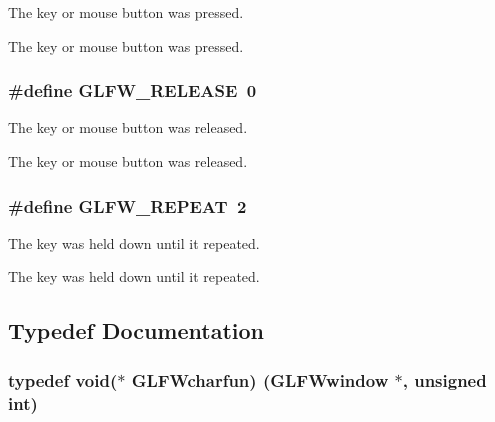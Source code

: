 The key or mouse button was pressed. 

The key or mouse button was pressed. \hypertarget{group__input_gada11d965c4da13090ad336e030e4d11f}{}
\subsubsection[{G\+L\+F\+W\+\_\+\+R\+E\+L\+E\+A\+S\+E}]{\setlength{\rightskip}{0pt plus 5cm}\#define G\+L\+F\+W\+\_\+\+R\+E\+L\+E\+A\+S\+E~0}\label{group__input_gada11d965c4da13090ad336e030e4d11f}


The key or mouse button was released. 

The key or mouse button was released. \hypertarget{group__input_gac96fd3b9fc66c6f0eebaf6532595338f}{}
\subsubsection[{G\+L\+F\+W\+\_\+\+R\+E\+P\+E\+A\+T}]{\setlength{\rightskip}{0pt plus 5cm}\#define G\+L\+F\+W\+\_\+\+R\+E\+P\+E\+A\+T~2}\label{group__input_gac96fd3b9fc66c6f0eebaf6532595338f}


The key was held down until it repeated. 

The key was held down until it repeated. 

\subsection{Typedef Documentation}
\hypertarget{group__input_gabf24451c7ceb1952bc02b17a0d5c3e5f}{}
\subsubsection[{G\+L\+F\+Wcharfun}]{\setlength{\rightskip}{0pt plus 5cm}typedef void($\ast$  G\+L\+F\+Wcharfun) ({\bf G\+L\+F\+Wwindow} $\ast$, unsigned int)}\label{group__input_gabf24451c7ceb1952bc02b17a0d5c3e5f}


